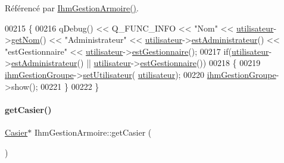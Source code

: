 Référencé par \hyperlink{class_ihm_gestion_armoire_a7aa5e1514dd5d1b5648a2f6dd36970f9}{Ihm\+Gestion\+Armoire()}.


\begin{DoxyCode}
00215 \{
00216     qDebug() << Q\_FUNC\_INFO << \textcolor{stringliteral}{"Nom"} << \hyperlink{class_ihm_gestion_armoire_aa14adf3863cf09947411fc33e413076c}{utilisateur}->\hyperlink{class_utilisateur_adfffec2519ba338497de55b61e7bc420}{getNom}() << \textcolor{stringliteral}{"Administrateur"} << 
      \hyperlink{class_ihm_gestion_armoire_aa14adf3863cf09947411fc33e413076c}{utilisateur}->\hyperlink{class_utilisateur_a2c4ede0ec936ebd64d73df1e1dde3a5d}{estAdministrateur}() << \textcolor{stringliteral}{"estGestionnaire"} << 
      \hyperlink{class_ihm_gestion_armoire_aa14adf3863cf09947411fc33e413076c}{utilisateur}->\hyperlink{class_utilisateur_a3c86ddd77b243fd3f12ad2e85ff06759}{estGestionnaire}();
00217     \textcolor{keywordflow}{if}(\hyperlink{class_ihm_gestion_armoire_aa14adf3863cf09947411fc33e413076c}{utilisateur}->\hyperlink{class_utilisateur_a2c4ede0ec936ebd64d73df1e1dde3a5d}{estAdministrateur}() || 
      \hyperlink{class_ihm_gestion_armoire_aa14adf3863cf09947411fc33e413076c}{utilisateur}->\hyperlink{class_utilisateur_a3c86ddd77b243fd3f12ad2e85ff06759}{estGestionnaire}())
00218     \{
00219         \hyperlink{class_ihm_gestion_armoire_af590a9a2a114e7ee791db540f87c01ef}{ihmGestionGroupe}->\hyperlink{class_ihm_gestion_groupe_a88bbe8b5652781d4a80a50ed6bf9d329}{setUtilisateur}(
      \hyperlink{class_ihm_gestion_armoire_aa14adf3863cf09947411fc33e413076c}{utilisateur});
00220         \hyperlink{class_ihm_gestion_armoire_af590a9a2a114e7ee791db540f87c01ef}{ihmGestionGroupe}->show();
00221     \}
00222 \}
\end{DoxyCode}
\mbox{\label{class_ihm_gestion_armoire_a347e1dc419cb74e5046dc95b5ffbf09e}} 
\paragraph{\texorpdfstring{get\+Casier()}{getCasier()}}
{\footnotesize\ttfamily \hyperlink{class_casier}{Casier}$\ast$ Ihm\+Gestion\+Armoire\+::get\+Casier (\begin{DoxyParamCaption}{ }\end{DoxyParamCaption})}

\mbox{\label{class_ihm_gestion_armoire_a024905507f9700b2afa794d7c357546f}} 
